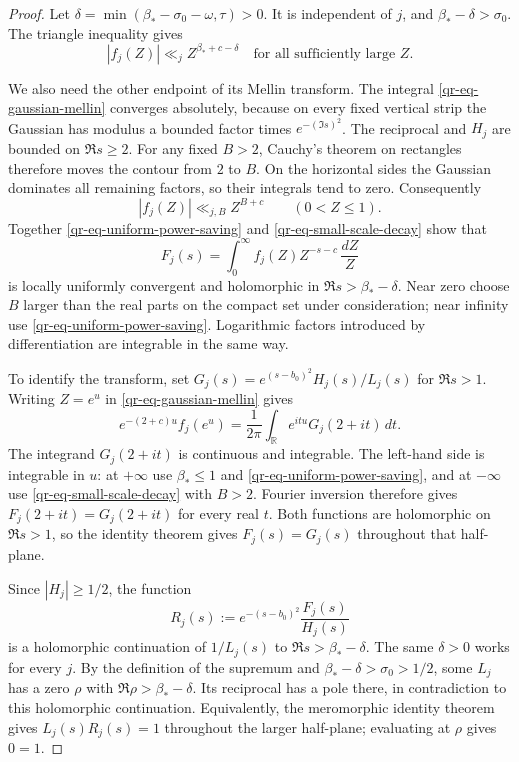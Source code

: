 \begin{proof}
Let $\delta=\min(\beta_*-\sigma_0-\omega,\tau)>0$.
It is independent of $j$, and $\beta_*-\delta>\sigma_0$.
The triangle inequality gives
\begin{equation}\label{qr-eq-uniform-power-saving}
 |f_j(Z)|\ll_j Z^{\beta_*+c-\delta}
 \quad\text{for all sufficiently large }Z.
\end{equation}

We also need the other endpoint of its Mellin transform. The
integral \eqref{qr-eq-gaussian-mellin} converges absolutely, because
on every fixed vertical strip the Gaussian has modulus a bounded
factor times $e^{-(\Im s)^2}$. The reciprocal and $H_j$ are bounded
on $\Re s\geq2$. For any fixed $B>2$, Cauchy's theorem on rectangles
therefore moves the contour from $2$ to $B$. On the horizontal sides
the Gaussian dominates all remaining factors, so their integrals
tend to zero. Consequently
\begin{equation}\label{qr-eq-small-scale-decay}
 |f_j(Z)|\ll_{j,B}Z^{B+c}\qquad(0<Z\leq1).
\end{equation}
Together \eqref{qr-eq-uniform-power-saving} and
\eqref{qr-eq-small-scale-decay} show that
\[
 F_j(s)=\int_0^\infty f_j(Z)Z^{-s-c}\,\frac{dZ}{Z}
\]
is locally uniformly convergent and holomorphic in
$\Re s>\beta_*-\delta$. Near zero choose $B$ larger than the real
parts on the compact set under consideration; near infinity use
\eqref{qr-eq-uniform-power-saving}. Logarithmic factors introduced
by differentiation are integrable in the same way.

To identify the transform, set
$G_j(s)=e^{(s-b_0)^2}H_j(s)/L_j(s)$ for $\Re s>1$.
Writing $Z=e^u$ in \eqref{qr-eq-gaussian-mellin} gives
\[
 e^{-(2+c)u}f_j(e^u)
   =\frac1{2\pi}\int_{\mathbb R}e^{itu}G_j(2+it)\,dt.
\]
The integrand $G_j(2+it)$ is continuous and integrable. The
left-hand side is integrable in $u$: at $+\infty$ use
$\beta_*\leq1$ and \eqref{qr-eq-uniform-power-saving}, and at
$-\infty$ use \eqref{qr-eq-small-scale-decay} with $B>2$.
Fourier inversion therefore gives
$F_j(2+it)=G_j(2+it)$ for every real $t$.
Both functions are holomorphic on $\Re s>1$, so the identity
theorem gives $F_j(s)=G_j(s)$ throughout that half-plane.

Since $|H_j|\geq1/2$, the function
\[
 R_j(s):=e^{-(s-b_0)^2}\frac{F_j(s)}{H_j(s)}
\]
is a holomorphic continuation of $1/L_j(s)$ to
$\Re s>\beta_*-\delta$. The same $\delta>0$ works for every $j$.
By the definition of the supremum and
$\beta_*-\delta>\sigma_0>1/2$, some $L_j$ has a zero $\rho$ with
$\Re\rho>\beta_*-\delta$. Its reciprocal has a pole there, in
contradiction to this holomorphic continuation. Equivalently, the
meromorphic identity theorem gives $L_j(s)R_j(s)=1$ throughout
the larger half-plane; evaluating at $\rho$ gives $0=1$.
\end{proof}

